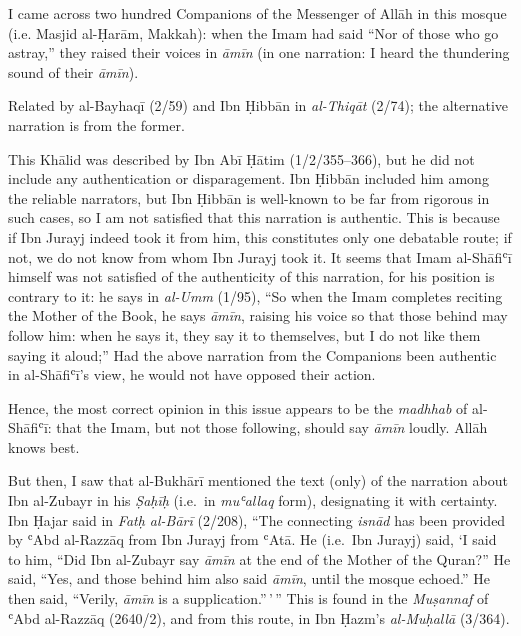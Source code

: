 \begin{mdframed}[style=narration, frametitle={Narration}]
I came across two hundred Companions of the Messenger of Allāh \pbuh in this mosque (i.e. Masjid al-Ḥarām, Makkah): when the Imam had said “Nor of those who go astray,” they raised their voices in \textit{āmīn} (in one narration: I heard the thundering sound of their \textit{āmīn}).
\end{mdframed}

Related by al-Bayhaqī (2/59) and Ibn Ḥibbān in \emph{al-Thiqāt} (2/74);
the alternative narration is from the former.

This Khālid was described by Ibn Abī Ḥātim (1/2/355--366), but he did
not include any authentication or disparagement. Ibn Ḥibbān included him
among the reliable narrators, but Ibn Ḥibbān is well-known to be far
from rigorous in such cases, so I am not satisfied that this narration
is authentic. This is because if Ibn Jurayj indeed took it from him,
this constitutes only one debatable route; if not, we do not know from
whom Ibn Jurayj took it. It seems that Imam al-Shāfiʿī himself was not
satisfied of the authenticity of this narration, for his position is
contrary to it: he says in \emph{al-Umm} (1/95), ``So when the Imam
completes reciting the Mother of the Book, he says \emph{āmīn}, raising
his voice so that those behind may follow him: when he says it, they say
it to themselves, but I do not like them saying it aloud;'' Had the
above narration from the Companions been authentic in al-Shāfiʿī's view,
he would not have opposed their action.

Hence, the most correct opinion in this issue appears to be the
\emph{madhhab} of al-Shāfiʿī: that the Imam, but not those following,
should say \emph{āmīn} loudly. Allāh knows best.

But then, I saw that al-Bukhārī mentioned the text (only) of the
narration about Ibn al-Zubayr in his \emph{Ṣaḥīḥ} (i.e.~in
\emph{muʿallaq} form), designating it with certainty. Ibn Ḥajar said in
\emph{Fatḥ al-Bārī} (2/208), ``The connecting \emph{isnād} has been
provided by ʿAbd al-Razzāq from Ibn Jurayj from ʿAtā. He (i.e.~Ibn
Jurayj) said, `I said to him, ``Did Ibn al-Zubayr say \emph{āmīn} at the
end of the Mother of the Quran?'' He said, ``Yes, and those behind him
also said \emph{āmīn}, until the mosque echoed.'' He then said,
``Verily, \emph{āmīn} is a supplication.''\,'\,'' This is found in the
\emph{Muṣannaf} of ʿAbd al-Razzāq (2640/2), and from this route, in Ibn
Ḥazm's \emph{al-Muḥallā} (3/364).

